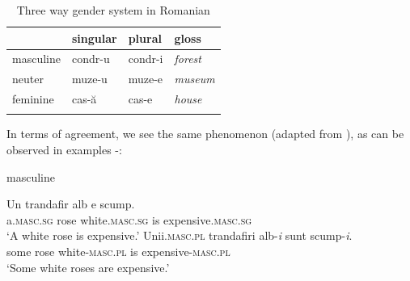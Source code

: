 \begin{table}
  \centering
  \begin{tabular}{llll}
    \lsptoprule
              & singular                   & plural                    & gloss           \\
    \midrule
    masculine & \cellcolor{gray!25}condr-u & condr-i                    & \textit{forest} \\
    neuter    & \cellcolor{gray!25}muze-u  & \cellcolor{gray!25}muze-e & \textit{museum} \\
    feminine  & cas-ă                      & \cellcolor{gray!25}cas-e  & \textit{house}  \\
    \lspbottomrule
  \end{tabular}
  \caption{Three way gender system in Romanian}\label{tab:gender-rom}
\end{table}

In terms of agreement, we see the same phenomenon (adapted from \citealt{Farkas.1990}), as can be observed in examples -:

\begin{exe}
    \ex \label{romanian-masc-exe} masculine
    \begin{xlist}
        \ex 
        \gll Un trandafir alb e scump.\\
        a.\textsc{masc.sg} rose white.\textsc{masc.sg} is expensive.\textsc{masc.sg}\\
        \glt `A white rose is expensive.'
        \ex 
        \gll Unii.\textsc{masc.pl} trandafiri alb-\textit{i} sunt scump-\textit{i}.\\
        some rose white-\textsc{masc.pl} is expensive-\textsc{masc.pl}\\
        \glt `Some white roses are expensive.'
    \end{xlist}
    \end{exe}
    \newpage
    
